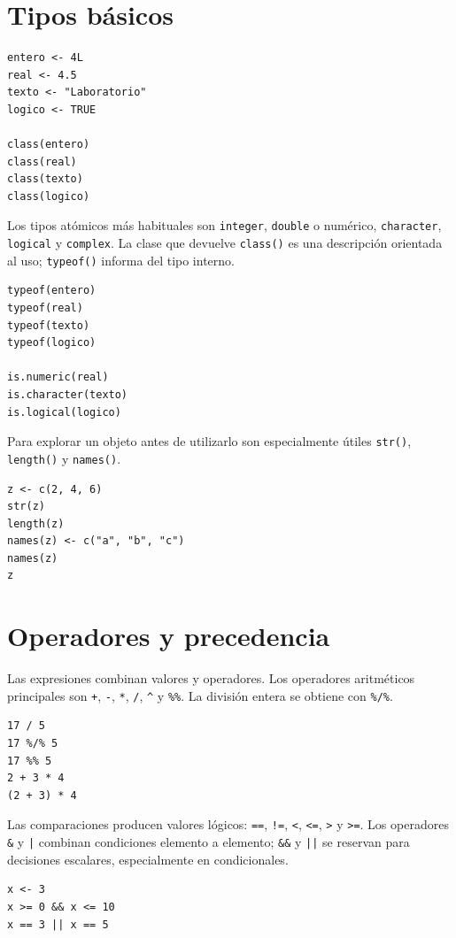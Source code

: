 \documentclass[11pt,a4paper,oneside]{book}
\begin{document}
\section{Tipos básicos}
\begin{lstlisting}[style=rstyle]
entero <- 4L
real <- 4.5
texto <- "Laboratorio"
logico <- TRUE

class(entero)
class(real)
class(texto)
class(logico)
\end{lstlisting}

Los tipos atómicos más habituales son \texttt{integer}, \texttt{double} o numérico, \texttt{character}, \texttt{logical} y \texttt{complex}. La clase que devuelve \texttt{class()} es una descripción orientada al uso; \texttt{typeof()} informa del tipo interno.

\begin{lstlisting}[style=rstyle]
typeof(entero)
typeof(real)
typeof(texto)
typeof(logico)

is.numeric(real)
is.character(texto)
is.logical(logico)
\end{lstlisting}

Para explorar un objeto antes de utilizarlo son especialmente útiles \texttt{str()}, \texttt{length()} y \texttt{names()}.

\begin{lstlisting}[style=rstyle]
z <- c(2, 4, 6)
str(z)
length(z)
names(z) <- c("a", "b", "c")
names(z)
z
\end{lstlisting}

\section{Operadores y precedencia}
Las expresiones combinan valores y operadores. Los operadores aritméticos principales son \texttt{+}, \texttt{-}, \texttt{*}, \texttt{/}, \texttt{\^} y \texttt{\%\%}. La división entera se obtiene con \texttt{\%/\%}.

\begin{lstlisting}[style=rstyle]
17 / 5
17 %/% 5
17 %% 5
2 + 3 * 4
(2 + 3) * 4
\end{lstlisting}

Las comparaciones producen valores lógicos: \texttt{==}, \texttt{!=}, \texttt{<}, \texttt{<=}, \texttt{>} y \texttt{>=}. Los operadores \texttt{\&} y \texttt{|} combinan condiciones elemento a elemento; \texttt{\&\&} y \texttt{||} se reservan para decisiones escalares, especialmente en condicionales.

\begin{lstlisting}[style=rstyle]
x <- 3
x >= 0 && x <= 10
x == 3 || x == 5
\end{lstlisting}
\end{document}
